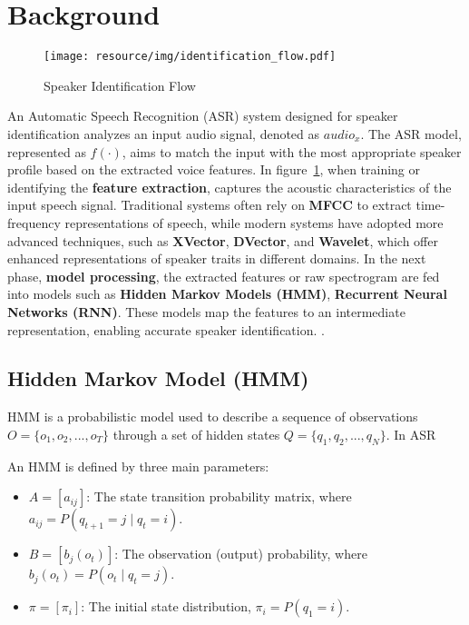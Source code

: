 \documentclass[conference]{IEEEtran}
\begin{document}
\section{Background}


\begin{figure}[H]
    \centering
    \begin{minipage}{0.5\textwidth}
        \centering
        \texttt{[image: resource/img/identification\_flow.pdf]}
        \caption{Speaker Identification Flow}
        \label{fig:identification_flow}
    \end{minipage}

\end{figure}


An Automatic Speech Recognition (ASR) system designed for speaker identification analyzes an input audio signal, denoted as $audio_x$.
The ASR model, represented as $f(\cdot)$, aims to match the input with the most appropriate speaker profile based on the extracted voice features.
In figure~\ref{fig:identification_flow}, when training or identifying the \textbf{feature extraction},
captures the acoustic characteristics of the input speech signal. Traditional systems often rely on \textbf{MFCC} to extract time-frequency representations of speech,
while modern systems have adopted more advanced techniques, such as \textbf{XVector}, \textbf{DVector}, and \textbf{Wavelet}, which offer enhanced representations of
speaker traits in different domains. In the next phase, \textbf{model processing}, the extracted features or raw spectrogram are fed into models such as \textbf{Hidden Markov Models (HMM)},
\textbf{Recurrent Neural Networks (RNN)}. These models map the features to an intermediate representation,
enabling accurate speaker identification. \cite{davis1980comparison, Snyder2018Xvectors,wan2018dvector,graves2013speech}.



\subsection{Hidden Markov Model (HMM)}
HMM is a probabilistic model used to describe a sequence of observations $O = \{o_1, o_2, ..., o_T\}$ through a set of hidden states $Q = \{q_1, q_2, ..., q_N\}$. In ASR

An HMM is defined by three main parameters:
\begin{itemize}
    \item $A = [a_{ij}]$: The state transition probability matrix, where $a_{ij} = P(q_{t+1} = j \mid q_t = i)$.
    \item $B = [b_j(o_t)]$: The observation (output) probability, where $b_j(o_t) = P(o_t \mid q_t = j)$.
    \item $\pi = [\pi_i]$: The initial state distribution, $\pi_i = P(q_1 = i)$.
\end{itemize}
\end{document}
